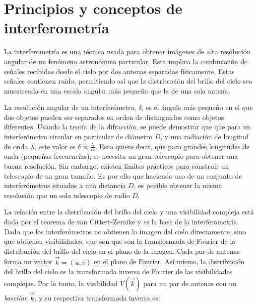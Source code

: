 \section{Principios y conceptos de interferometría}

La interferometría es una técnica usada para obtener imágenes de alta resolución angular de un fenómeno astronómico particular. Esta implica la combinación de señales recibidas desde el cielo por dos antenas separadas físicamente. Estas señales contienen ruido, permitiendo así que la distribución del brillo del cielo sea muestreada en una escala angular más pequeña que la de una sola antena. 

La resolución angular de un interferómetro, $\delta$, es el ángulo más pequeño en el que dos objetos pueden ser separados en orden de distinguirlos como objetos diferentes. Usando la teoría de la difracción, se puede demostrar que que para un interferómetro circular en particular de diámetro $D$, y una radiación de longitud de onda $\lambda$, este valor es $\delta \propto \frac{\lambda}{D}$. Esto quiere decir, que para grandes longitudes de onda (pequeñas frecuencias), se necesita un gran telescopio para obtener una buena resolución. Sin embargo, existen límites prácticos para construir un telescopio de un gran tamaño. Es por ello que haciendo uso de un conjunto de interferómetros situados a una distancia $D$, es posible obtener la misma resolución que un solo telescopio de radio $D$.



La relación entre la distribución del brillo del cielo y una visibilidad compleja está dada por el teorema de van Cittert-Zernike \citep{zernike} y es la base de la interferometría. Dado que los interferómetros no obtienen la imagen del cielo directamente, sino que obtienen visibilidades, que son que son la transformada de Fourier de la distribución del brillo del cielo en el plano de la imagen. Cada par de antenas forma un vector $\vec{k} = (u,v)$ en el plano de Fourier. Así mismo, la distribución del brillo del cielo es la transformada inversa de Fourier de las visibilidades complejas. Por lo tanto, la visibilidad $V(\vec{k})$ para un par de antenas con un \textit{baseline} $\vec{k}$, y su respectiva transformada inversa es:


